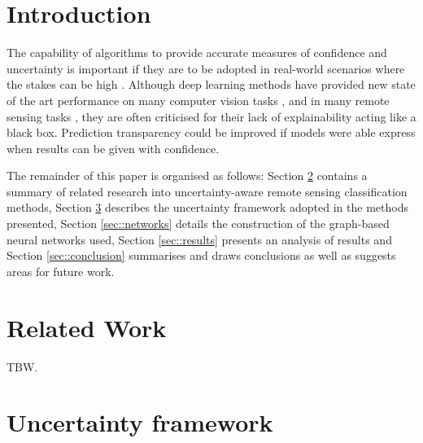 \documentclass[
twocolumn,
]{ceurart}
\begin{document}
\maketitle

\section{Introduction}
The capability of algorithms to provide accurate measures of confidence and uncertainty is important if they are to be adopted in real-world scenarios where the stakes can be high \cite{Goodman2017}.
Although deep learning methods have provided new state of the art performance on many computer vision tasks \cite{LeCun2015}, and in many remote sensing tasks \cite{LiangpeiZhang2016}, they are often criticised for their lack of explainability \cite{ChuanGuo2017} acting like a black box.
Prediction transparency could be improved if models were able express when results can be given with confidence.

The remainder of this paper is organised as follows: Section \ref{sec::related_work} contains a summary of related research into uncertainty-aware remote sensing classification methods, Section \ref{sec::unc_framework} describes the uncertainty framework adopted in the methods presented, Section \ref{sec::networks} details the construction of the graph-based neural networks used, Section \ref{sec::results} presents an analysis of results and Section \ref{sec::conclusion} summarises and draws conclusions as well as suggests areas for future work.

\section{Related Work}
\label{sec::related_work}
TBW.

\section{Uncertainty framework}
\label{sec::unc_framework}
\end{document}
